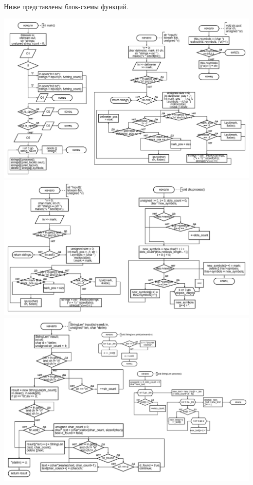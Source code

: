 \documentclass[12pt,a4paper]{extarticle}
\begin{document}
Ниже представлены блок-схемы функций.
\begin{center}
    \includegraphics[width=\linewidth]{figures/Frame 3.png}
    \includegraphics[width=\linewidth]{figures/Frame 4.png}
    \includegraphics[width=\linewidth]{figures/Frame 5.png}
\end{center}
\end{document}

